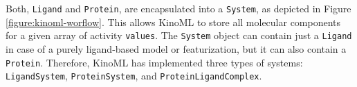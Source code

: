 \documentclass[9pt,lessons, pubversion]{livecoms}
\begin{document}
Both, \texttt{Ligand} and \texttt{Protein},  are encapsulated into a \texttt{System}, as depicted in Figure \ref{figure:kinoml-worflow}. This allows KinoML to store all molecular components for a given array of activity \texttt{values}. The \texttt{System} object can contain just a \texttt{Ligand} in case of a purely ligand-based model or featurization, but it can also contain a \texttt{Protein}. Therefore, KinoML has implemented three types of systems: \texttt{LigandSystem}, \texttt{ProteinSystem}, and \texttt{ProteinLigandComplex}.



	

    


	

\end{document}
